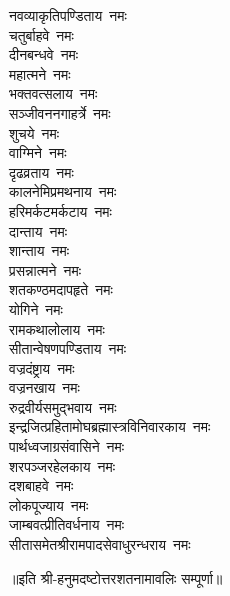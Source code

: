 \begin{multicols}{2}
\begin{flushleft}
नवव्याकृतिपण्डिताय~नमः\\
चतुर्बाहवे~नमः\\
दीनबन्धवे~नमः\\
महात्मने~नमः\\
भक्तवत्सलाय~नमः\\
सञ्जीवननगाहर्त्रे~नमः\\
शुचये~नमः\\
वाग्मिने~नमः\\
दृढव्रताय~नमः\\
कालनेमिप्रमथनाय~नमः\hfill{}\\
हरिमर्कटमर्कटाय~नमः\\
दान्ताय~नमः\\
शान्ताय~नमः\\
प्रसन्नात्मने~नमः\\
शतकण्ठमदापहृते~नमः\\
योगिने~नमः\\
रामकथालोलाय~नमः\\
सीतान्वेषणपण्डिताय~नमः\\
वज्रदंष्ट्राय~नमः\\
वज्रनखाय~नमः\hfill{}\\
रुद्रवीर्यसमुद्भवाय~नमः\\
इन्द्रजित्प्रहितामोघ\-ब्रह्मास्त्रविनिवारकाय~नमः\\
पार्थध्वजाग्रसंवासिने~नमः\\
शरपञ्जरहेलकाय~नमः\\
दशबाहवे~नमः\\
लोकपूज्याय~नमः\\
जाम्बवत्प्रीतिवर्धनाय~नमः\\
सीतासमेतश्रीराम\-पादसेवाधुरन्धराय~नमः\\
\end{flushleft}
\end{multicols}

\centerline{॥इति श्री-हनुमदष्टोत्तरशतनामावलिः सम्पूर्णा॥}
